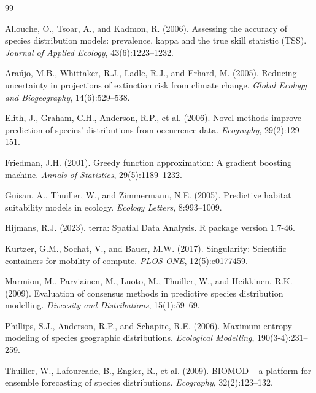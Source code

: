 \documentclass[12pt,a4paper]{report}
\begin{document}
\begin{thebibliography}{99}

Allouche, O., Tsoar, A., and Kadmon, R. (2006).
Assessing the accuracy of species distribution models: prevalence, kappa and the true skill statistic (TSS).
\emph{Journal of Applied Ecology}, 43(6):1223--1232.

Araújo, M.B., Whittaker, R.J., Ladle, R.J., and Erhard, M. (2005).
Reducing uncertainty in projections of extinction risk from climate change.
\emph{Global Ecology and Biogeography}, 14(6):529--538.

Elith, J., Graham, C.H., Anderson, R.P., et al. (2006).
Novel methods improve prediction of species' distributions from occurrence data.
\emph{Ecography}, 29(2):129--151.

Friedman, J.H. (2001).
Greedy function approximation: A gradient boosting machine.
\emph{Annals of Statistics}, 29(5):1189--1232.

Guisan, A., Thuiller, W., and Zimmermann, N.E. (2005).
Predictive habitat suitability models in ecology.
\emph{Ecology Letters}, 8:993--1009.

Hijmans, R.J. (2023).
terra: Spatial Data Analysis.
R package version 1.7-46.

Kurtzer, G.M., Sochat, V., and Bauer, M.W. (2017).
Singularity: Scientific containers for mobility of compute.
\emph{PLOS ONE}, 12(5):e0177459.

Marmion, M., Parviainen, M., Luoto, M., Thuiller, W., and Heikkinen, R.K. (2009).
Evaluation of consensus methods in predictive species distribution modelling.
\emph{Diversity and Distributions}, 15(1):59--69.

Phillips, S.J., Anderson, R.P., and Schapire, R.E. (2006).
Maximum entropy modeling of species geographic distributions.
\emph{Ecological Modelling}, 190(3-4):231--259.

Thuiller, W., Lafourcade, B., Engler, R., et al. (2009).
BIOMOD -- a platform for ensemble forecasting of species distributions.
\emph{Ecography}, 32(2):123--132.

\end{thebibliography}
\end{document}
